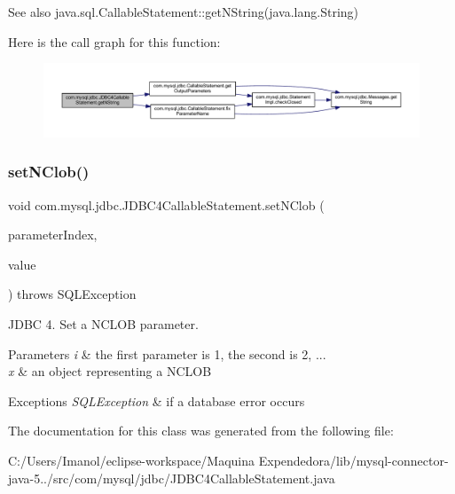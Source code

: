\begin{DoxySeeAlso}{See also}
java.\+sql.\+Callable\+Statement\+::get\+N\+String(java.\+lang.\+String) 
\end{DoxySeeAlso}
Here is the call graph for this function\+:
\nopagebreak
\begin{figure}[H]
\begin{center}
\leavevmode
\includegraphics[width=350pt]{classcom_1_1mysql_1_1jdbc_1_1_j_d_b_c4_callable_statement_ad92f78a50282fcf768519d0603c7a1ce_cgraph}
\end{center}
\end{figure}
\mbox{\label{classcom_1_1mysql_1_1jdbc_1_1_j_d_b_c4_callable_statement_a7b011b84966cea6527a7bb5aab8ecc81}} 
\subsubsection{\texorpdfstring{set\+N\+Clob()}{setNClob()}}
{\footnotesize\ttfamily void com.\+mysql.\+jdbc.\+J\+D\+B\+C4\+Callable\+Statement.\+set\+N\+Clob (\begin{DoxyParamCaption}\item[{int}]{parameter\+Index,  }\item[{N\+Clob}]{value }\end{DoxyParamCaption}) throws S\+Q\+L\+Exception}

J\+D\+BC 4. Set a N\+C\+L\+OB parameter.


\begin{DoxyParams}{Parameters}
{\em i} & the first parameter is 1, the second is 2, ... \\
\hline
{\em x} & an object representing a N\+C\+L\+OB\\
\hline
\end{DoxyParams}

\begin{DoxyExceptions}{Exceptions}
{\em S\+Q\+L\+Exception} & if a database error occurs \\
\hline
\end{DoxyExceptions}


The documentation for this class was generated from the following file\+:\begin{DoxyCompactItemize}
\item 
C\+:/\+Users/\+Imanol/eclipse-\/workspace/\+Maquina Expendedora/lib/mysql-\/connector-\/java-\/5../src/com/mysql/jdbc/J\+D\+B\+C4\+Callable\+Statement.\+java\end{DoxyCompactItemize}
